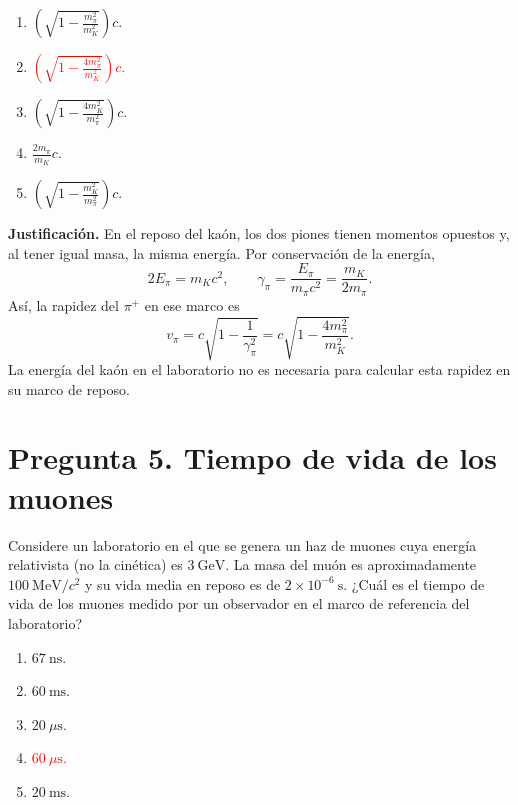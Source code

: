 \documentclass[a4paper,11pt]{article}
\newcommand{\pregunta}[2]{\section*{Pregunta #1. #2}}
\begin{document}
\begin{enumerate}[itemsep=0.3em]
    \item $\displaystyle \left(\sqrt{1-\frac{m_\pi^2}{m_K^2}}\right)c$.
    \item \textcolor{red}{$\displaystyle \left(\sqrt{1-\frac{4m_\pi^2}{m_K^2}}\right)c$.}
    \item $\displaystyle \left(\sqrt{1-\frac{4m_K^2}{m_\pi^2}}\right)c$.
    \item $\displaystyle \frac{2m_\pi}{m_K}c$.
    \item $\displaystyle \left(\sqrt{1-\frac{m_K^2}{m_\pi^2}}\right)c$.
\end{enumerate}

\begin{figure}[H]
\centering

\end{figure}

\textbf{Justificación.} En el reposo del kaón, los dos piones tienen momentos opuestos y, al tener igual masa, la misma energía. Por conservación de la energía,
\[
2E_\pi=m_Kc^2,
\qquad
\gamma_\pi=\frac{E_\pi}{m_\pi c^2}=\frac{m_K}{2m_\pi}.
\]
Así, la rapidez del $\pi^+$ en ese marco es
\[
v_\pi=c\sqrt{1-\frac{1}{\gamma_\pi^2}}
=c\sqrt{1-\frac{4m_\pi^2}{m_K^2}}.
\]
La energía del kaón en el laboratorio no es necesaria para calcular esta rapidez en su marco de reposo.

\pregunta{5}{Tiempo de vida de los muones}

Considere un laboratorio en el que se genera un haz de muones cuya energía relativista (no la cinética) es $3\ \mathrm{GeV}$. La masa del muón es aproximadamente $100\ \mathrm{MeV}/c^2$ y su vida media en reposo es de $2\times10^{-6}\ \mathrm{s}$. ¿Cuál es el tiempo de vida de los muones medido por un observador en el marco de referencia del laboratorio?

\begin{enumerate}
    \item $67\ \mathrm{ns}$.
    \item $60\ \mathrm{ms}$.
    \item $20\ \mu\mathrm{s}$.
    \item \textcolor{red}{$60\ \mu\mathrm{s}$.}
    \item $20\ \mathrm{ms}$.
\end{enumerate}

\begin{figure}[H]
\centering

\end{figure}
\end{document}
